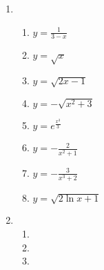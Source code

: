 \documentclass[a4paper]{article}
\begin{document}
\begin{enumerate}
\item %
  \begin{enumerate}
  \item $y = \frac{1}{3-x}$ %
  \item $y = \sqrt{x}$ %
  \item $y = \sqrt{2x-1}$ %
  \item $y = -\sqrt{x^2+3}$ %
  \item $y = e^{\frac{x^3}{3}}$ %
  \item $y = -\frac{2}{x^2+1}$ %
  \item $y = -\frac{3}{x^3+2}$ %
  \item $y = \sqrt{2\ln x +1}$ %
  \end{enumerate}

\item %

  \begin{enumerate}
  \item %
  \item %
  \item %
  \end{enumerate}
\end{enumerate}
\end{document}
